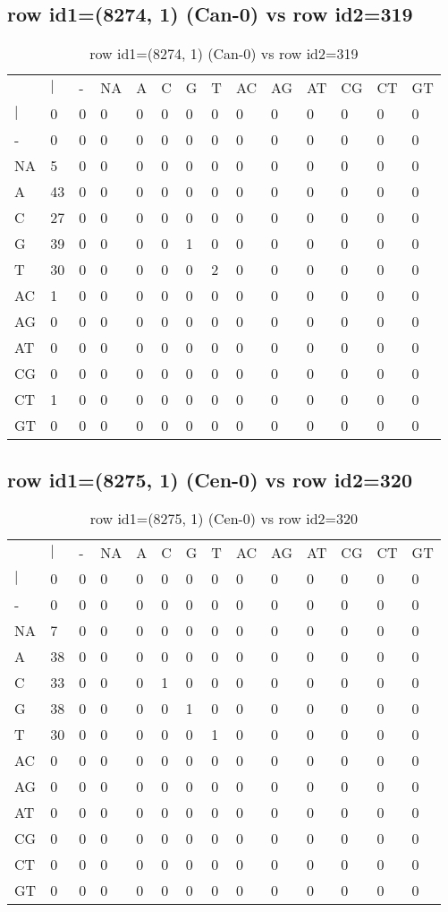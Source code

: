 \subsection{row id1=(8274, 1) (Can-0) vs row id2=319}
\begin{center}
\begin{longtable}{|l|l|l|l|l|l|l|l|l|l|l|l|l|l|}
\caption{row id1=(8274, 1) (Can-0) vs row id2=319} \label{table_dm230}\\
\hline
\\
\hline
&$|$&-&NA&A&C&G&T&AC&AG&AT&CG&CT&GT\\
$|$&0&0&0&0&0&0&0&0&0&0&0&0&0\\
-&0&0&0&0&0&0&0&0&0&0&0&0&0\\
NA&5&0&0&0&0&0&0&0&0&0&0&0&0\\
A&43&0&0&0&0&0&0&0&0&0&0&0&0\\
C&27&0&0&0&0&0&0&0&0&0&0&0&0\\
G&39&0&0&0&0&1&0&0&0&0&0&0&0\\
T&30&0&0&0&0&0&2&0&0&0&0&0&0\\
AC&1&0&0&0&0&0&0&0&0&0&0&0&0\\
AG&0&0&0&0&0&0&0&0&0&0&0&0&0\\
AT&0&0&0&0&0&0&0&0&0&0&0&0&0\\
CG&0&0&0&0&0&0&0&0&0&0&0&0&0\\
CT&1&0&0&0&0&0&0&0&0&0&0&0&0\\
GT&0&0&0&0&0&0&0&0&0&0&0&0&0\\
\hline
\end{longtable}
\end{center}

\subsection{row id1=(8275, 1) (Cen-0) vs row id2=320}
\begin{center}
\begin{longtable}{|l|l|l|l|l|l|l|l|l|l|l|l|l|l|}
\caption{row id1=(8275, 1) (Cen-0) vs row id2=320} \label{table_dm232}\\
\hline
\\
\hline
&$|$&-&NA&A&C&G&T&AC&AG&AT&CG&CT&GT\\
$|$&0&0&0&0&0&0&0&0&0&0&0&0&0\\
-&0&0&0&0&0&0&0&0&0&0&0&0&0\\
NA&7&0&0&0&0&0&0&0&0&0&0&0&0\\
A&38&0&0&0&0&0&0&0&0&0&0&0&0\\
C&33&0&0&0&1&0&0&0&0&0&0&0&0\\
G&38&0&0&0&0&1&0&0&0&0&0&0&0\\
T&30&0&0&0&0&0&1&0&0&0&0&0&0\\
AC&0&0&0&0&0&0&0&0&0&0&0&0&0\\
AG&0&0&0&0&0&0&0&0&0&0&0&0&0\\
AT&0&0&0&0&0&0&0&0&0&0&0&0&0\\
CG&0&0&0&0&0&0&0&0&0&0&0&0&0\\
CT&0&0&0&0&0&0&0&0&0&0&0&0&0\\
GT&0&0&0&0&0&0&0&0&0&0&0&0&0\\
\hline
\end{longtable}
\end{center}


